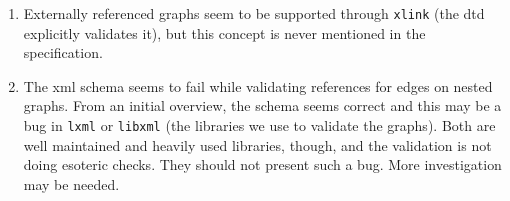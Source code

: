 \begin{enumerate}
    \item Externally referenced graphs seem to be supported through \texttt{xlink} (the \gls{dtd} explicitly validates it), but this concept is never mentioned in the specification.
    \item The \gls{xml} schema seems to fail while validating references for edges on nested graphs. From an initial overview, the schema seems correct and this may be a bug in \texttt{lxml} or \texttt{libxml} (the libraries we use to validate the graphs). Both are well maintained and heavily used libraries, though, and the validation is not doing esoteric checks. They should not present such a bug. More investigation may be needed.
\end{enumerate}
